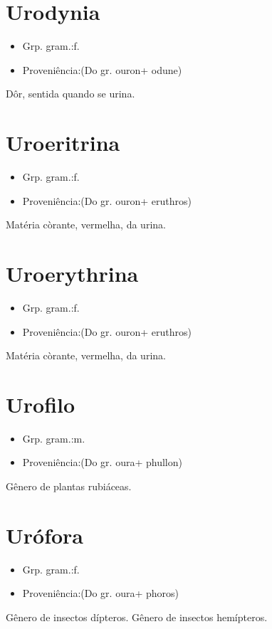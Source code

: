 \documentclass{article}
\begin{document}
\section{Urodynia}
\begin{itemize}
\item {Grp. gram.:f.}
\end{itemize}
\begin{itemize}
\item {Proveniência:(Do gr. \textunderscore ouron\textunderscore  + \textunderscore odune\textunderscore )}
\end{itemize}
Dôr, sentida quando se urina.
\section{Uroeritrina}
\begin{itemize}
\item {Grp. gram.:f.}
\end{itemize}
\begin{itemize}
\item {Proveniência:(Do gr. \textunderscore ouron\textunderscore  + \textunderscore eruthros\textunderscore )}
\end{itemize}
Matéria còrante, vermelha, da urina.
\section{Uroerythrina}
\begin{itemize}
\item {Grp. gram.:f.}
\end{itemize}
\begin{itemize}
\item {Proveniência:(Do gr. \textunderscore ouron\textunderscore  + \textunderscore eruthros\textunderscore )}
\end{itemize}
Matéria còrante, vermelha, da urina.
\section{Urofilo}
\begin{itemize}
\item {Grp. gram.:m.}
\end{itemize}
\begin{itemize}
\item {Proveniência:(Do gr. \textunderscore oura\textunderscore  + \textunderscore phullon\textunderscore )}
\end{itemize}
Gênero de plantas rubiáceas.
\section{Urófora}
\begin{itemize}
\item {Grp. gram.:f.}
\end{itemize}
\begin{itemize}
\item {Proveniência:(Do gr. \textunderscore oura\textunderscore  + \textunderscore phoros\textunderscore )}
\end{itemize}
Gênero de insectos dípteros.
Gênero de insectos hemípteros.
\end{document}
